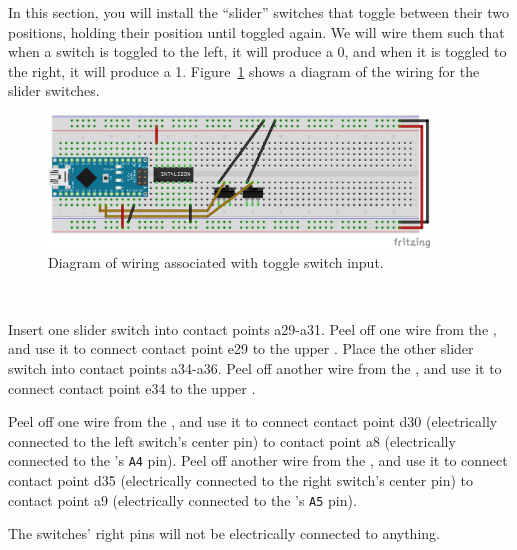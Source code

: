 In this section, you will install the ``slider'' switches that toggle between their two positions, holding their position until toggled again.
We will wire them such that when a switch is toggled to the left, it will produce a 0, and when it is toggled to the right, it will produce a 1.
Figure~\ref{fig:switch-diagram} shows a diagram of the wiring for the slider switches.

\begin{figure}[p]
    \centering
    \includegraphics[width=0.9\textwidth]{fritzing_diagrams/switch-spi}
    \caption{Diagram of wiring associated with toggle switch input.
        \label{fig:switch-diagram}}
\end{figure}

\disconnect\

Insert one slider switch into contact points a29-a31.
Peel off one wire from the \rainbow, and use it to connect contact point e29 to the upper \ground.
Place the other slider switch into contact points a34-a36.
Peel off another wire from the \rainbow, and use it to connect contact point e34 to the upper \ground.

Peel off one wire from the \rainbow, and use it to connect contact point d30 (electrically connected to the left switch's center pin) to contact point a8 (electrically connected to the \developmentboard's \texttt{A4} pin).
Peel off another wire from the \rainbow, and use it to connect contact point d35 (electrically connected to the right switch's center pin) to contact point a9 (electrically connected to the \developmentboard's \texttt{A5} pin).

The switches' right pins will not be electrically connected to anything.


